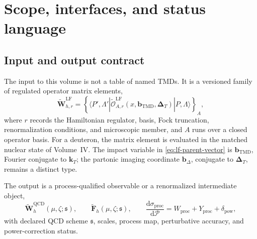 \documentclass[11pt]{article}
\newcommand{\kT}{\bm{k}_{T}}
\newcommand{\DT}{\bm{\Delta}_{T}}
\newcommand{\bD}{\bm{b}_{\Delta}}
\newcommand{\bM}{\bm{b}_{\mathrm{TMD}}}
\newcommand{\dd}{\mathrm{d}}
\newcommand{\LF}{\mathrm{LF}}
\newcommand{\QCD}{\mathrm{QCD}}
\newcommand{\cO}{\mathcal O}
\newcommand{\cP}{\mathcal P}
\newcommand{\FO}{\mathrm{FO}}
\newcommand{\asy}{\mathrm{asy}}
\newcommand{\proc}{\mathrm{proc}}
\begin{document}
\begin{abstract}
At the process layer, Drell--Yan, SIDIS, inclusive DIS, and gluon-sensitive
channels receive typed factorization records containing the hard kernel,
link map, color weights, fragmentation or partner TMD, measurement function,
Glauber status, and factorization status.  The observable is assembled as
\(W+Y\), with
\(Y=\sigma_{\FO}-[W]_{\asy,\FO}\) at the same perturbative order and in the
same scheme.  Rank-resolved Fourier--Bessel kernels are used for every angular
harmonic, so a scalar \(J_0\) transform can never be applied to a nonzero-rank
coefficient.  We provide formal commutation results for evolution and linear
nuclear convolution, scheme-covariance relations, uncertainty and convergence
requirements, software interfaces, analytic benchmarks, and fail-closed
acceptance gates.  The result is a reproducible bridge from the regulated
microscopic state to multi-scale QCD observables without erasing flavor,
spin, rank, link/color, nuclear, or member identity.
\end{abstract}

\tableofcontents

\section{Scope, interfaces, and status language}
\label{sec:scope}

\subsection{Input and output contract}

The input to this volume is not a table of named TMDs.  It is a versioned
family of regulated operator matrix elements,
\begin{equation}
 \widetilde{\bm W}^{\LF}_{h,r}
 =
 \left\{
 \langle P',\Lambda'|
 \widetilde{\cO}^{\LF}_{A,r}(x,\bM,\DT)
 |P,\Lambda\rangle
 \right\}_{A},
 \label{eq:lf-parent-vector}
\end{equation}
where \(r\) records the Hamiltonian regulator, basis, Fock truncation,
renormalization conditions, and microscopic member, and \(A\) runs over a
closed operator basis.  For a deuteron, the matrix element is evaluated in the
matched nuclear state of Volume~IV.  The impact variable in
\cref{eq:lf-parent-vector} is \(\bM\), Fourier conjugate to \(\kT\); the
partonic imaging coordinate \(\bD\), conjugate to \(\DT\), remains a distinct
type.

The output is a process-qualified observable or a renormalized intermediate
object,
\begin{equation}
 \widetilde{\bm W}^{\QCD}_{h}
 (\mu,\zeta;\mathfrak s),
 \qquad
 \widetilde{\bm F}_{h}
 (\mu,\zeta;\mathfrak s),
 \qquad
 \frac{\dd\sigma_{\proc}}{\dd\cP}
 =W_{\proc}+Y_{\proc}+\delta_{\mathrm{pow}},
 \label{eq:volume5-outputs}
\end{equation}
with declared QCD scheme \(\mathfrak s\), scales, process map, perturbative
accuracy, and power-correction status.
\end{document}
